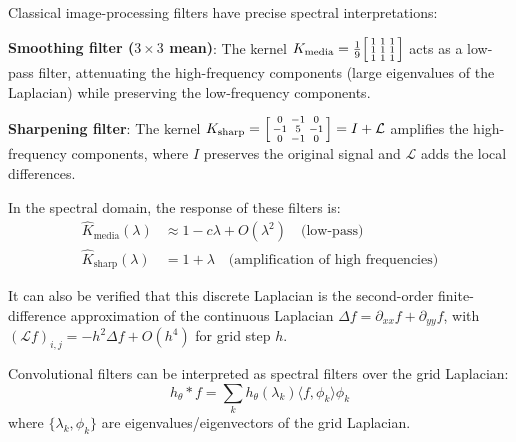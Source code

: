 \begin{example}\label{ex:filtros_paso_bajo_alto}
Classical image-processing filters have precise spectral interpretations:

\textbf{Smoothing filter ($3 \times 3$ mean)}: The kernel $K_{\text{media}} = \frac{1}{9}\begin{bsmallmatrix} 1 & 1 & 1 \\ 1 & 1 & 1 \\ 1 & 1 & 1 \end{bsmallmatrix}$ acts as a low-pass filter, attenuating the high-frequency components (large eigenvalues of the Laplacian) while preserving the low-frequency components.

\textbf{Sharpening filter}: The kernel $K_{\text{sharp}} = \begin{bsmallmatrix} 0 & -1 & 0 \\ -1 & 5 & -1 \\ 0 & -1 & 0 \end{bsmallmatrix} = I + \mathcal{L}$ amplifies the high-frequency components, where $I$ preserves the original signal and $\mathcal{L}$ adds the local differences.

In the spectral domain, the response of these filters is:
\begin{align}
\hat{K}_{\text{media}}(\lambda) &\approx 1 - c\lambda + O(\lambda^2) \quad \text{(low-pass)} \\
\hat{K}_{\text{sharp}}(\lambda) &= 1 + \lambda \quad \text{(amplification of high frequencies)}
\end{align}
\end{example}

It can also be verified that this discrete Laplacian is the second-order finite-difference approximation of the continuous Laplacian $\Delta f = \partial_{xx} f + \partial_{yy} f$, with $(\mathcal{L}f)_{i,j} = -h^2 \Delta f + O(h^4)$ for grid step $h$.

\begin{theorem}\label{thm:cnns_filtros_espectrales_grillas}
Convolutional filters can be interpreted as spectral
filters over the grid Laplacian:
\[
h_\theta * f = \sum_k h_\theta(\lambda_k)\langle f, \phi_k\rangle\phi_k
\]
where \(\{\lambda_k, \phi_k\}\) are eigenvalues/eigenvectors of the grid Laplacian.
\end{theorem}

